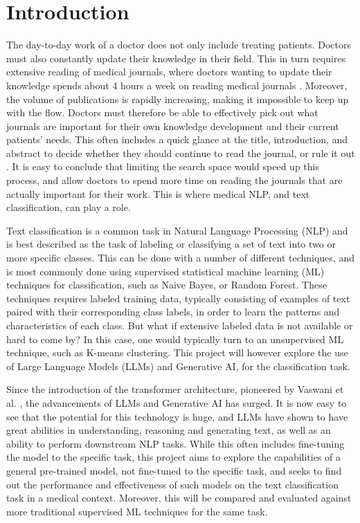\section{Introduction}
\label{sec:introduction}


The day-to-day work of a doctor does not only include treating patients. Doctors must also constantly update their knowledge in their field. This in turn requires extensive reading of medical journals, where doctors wanting to update their knowledge spends about 4 hours a week on reading medical journals \cite{Garba2010ProliferationsBlessing}. Moreover, the volume of publications is rapidly increasing, making it impossible to keep up with the flow. Doctors must therefore be able to effectively pick out what journals are important for their own knowledge development and their current patients' needs. This often includes a quick glance at the title, introduction, and abstract to decide whether they should continue to read the journal, or rule it out \cite{Garba2010ProliferationsBlessing}. It is easy to conclude that limiting the search space would speed up this process, and allow doctors to spend more time on reading the journals that are actually important for their work. This is where medical NLP, and text classification, can play a role.

Text classification is a common task in Natural Language Processing (NLP) and is best described as the task of labeling or classifying a set of text into two or more specific classes. This can be done with a number of different techniques, and is most commonly done using supervised statistical machine learning (ML) techniques for classification, such as Naive Bayes, or Random Forest. These techniques requires labeled training data, typically consisting of examples of text paired with their corresponding class labels, in order to learn the patterns and characteristics of each class. But what if extensive labeled data is not available or hard to come by? In this case, one would typically turn to an unsupervised ML technique, such as K-means clustering. This project will however explore the use of Large Language Models (LLMs) and Generative AI, for the classification task.

Since the introduction of the transformer architecture, pioneered by Vaswani et al. \cite{Vaswani2017AttentionNeed}, the advancements of LLMs and Generative AI has surged. It is now easy to see that the potential for this technology is huge, and LLMs have shown to have great abilities in understanding, reasoning and generating text, as well as an ability to perform downstream NLP tasks. While this often includes fine-tuning the model to the specific task, this project aims to explore the capabilities of a general pre-trained model, not fine-tuned to the specific task, and seeks to find out the performance and effectiveness of such models on the text classification task in a medical context. Moreover, this will be compared and evaluated against more traditional supervised ML techniques for the same task.